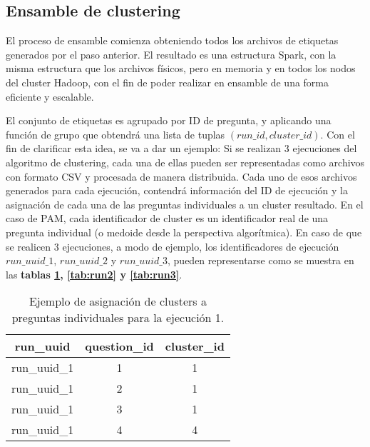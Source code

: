 \subsection{Ensamble de clustering}
El proceso de ensamble comienza obteniendo todos los archivos de etiquetas generados por el paso anterior. El resultado es una estructura Spark, con la misma estructura que los archivos físicos, pero en memoria y en todos los nodos del cluster Hadoop, con el fin de poder realizar en ensamble de una forma eficiente y escalable.

\bigskip El conjunto de etiquetas es agrupado por ID de pregunta, y aplicando una función de grupo que obtendrá una lista de tuplas \((run\_id, cluster\_id)\). Con el fin de clarificar esta idea, se va a dar un ejemplo: Si se realizan 3 ejecuciones del algoritmo de clustering, cada una de ellas pueden ser representadas como archivos con formato CSV y procesada de manera distribuida. Cada uno de esos archivos generados para cada ejecución, contendrá información del ID de ejecución y la asignación de cada una de las preguntas individuales a un cluster resultado. En el caso de PAM, cada identificador de cluster es un identificador real de una pregunta individual (o medoide desde la perspectiva algorítmica). En caso de que se realicen 3 ejecuciones, a modo de ejemplo, los identificadores de ejecución \(run\_uuid\_1\), \(run\_uuid\_2\) y \(run\_uuid\_3\), pueden representarse como se muestra en las \textbf{tablas \ref{tab:run1}, \ref{tab:run2} y \ref{tab:run3}}.

\begin{table}[]
	\centering
	\begin{tabular}{|c|c|c|}
		\hline
		\textbf{run\_uuid} & \textbf{question\_id} & \textbf{cluster\_id} \\ \hline
		run\_uuid\_1       & 1                     & 1                    \\ \hline
		run\_uuid\_1       & 2                     & 1                    \\ \hline
		run\_uuid\_1       & 3                     & 1                    \\ \hline
		run\_uuid\_1       & 4                     & 4                    \\ \hline
	\end{tabular}
	\caption{Ejemplo de asignación de clusters a preguntas individuales para la ejecución 1.}
	\label{tab:run1}
\end{table}

